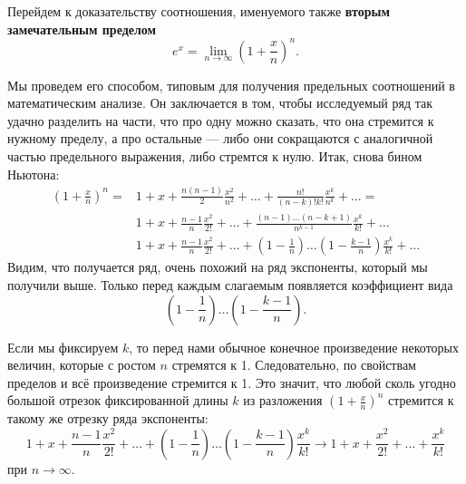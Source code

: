 \begin{enumerate}
Перейдем к доказательству соотношения, именуемого также \textbf{вторым замечательным пределом}
$$
e^x=\lim_{n\to\infty}\left(1+\frac xn\right)^n.
$$

Мы проведем его способом, типовым для получения предельных соотношений в математическим анализе. Он заключается в том, чтобы исследуемый ряд так удачно разделить на части, что про одну можно сказать, что она стремится к нужному пределу, а про остальные --- либо они сокращаются с аналогичной частью предельного выражения, либо стремтся к нулю. Итак, снова бином Ньютона:
\begin{align*}
\left(1+\frac xn\right)^n = & 1 + x + \frac{n(n-1)}{2}\frac{x^2}{n^2} + \dots +
\frac{n!}{(n-k)!k!}\frac{x^k}{n^k}+\dots = \\
& 1 + x + \frac{n-1}{n}\frac{x^2}{2!} + \dots + \frac{(n-1)\dots(n-k+1)}{n^{k-1}}\frac{x^k}{k!}+\dots \\
& 1 + x + \frac{n-1}{n}\frac{x^2}{2!} + \dots + \left(1-\frac 1n\right)\dots\left(1-\frac{k-1}{n}\right)\frac{x^k}{k!}+\dots
\end{align*}
Видим, что получается ряд, очень похожий на ряд экспоненты, который мы получили выше. Только перед каждым слагаемым появляется коэффициент вида
$$
\left(1-\frac 1n\right)\dots\left(1-\frac{k-1}{n}\right).
$$

Если мы фиксируем $k$, то перед нами обычное конечное произведение некоторых величин, которые с ростом $n$ стремятся к 1. Следовательно, по свойствам пределов и всё произведение стремится к 1. Это значит, что любой сколь угодно большой отрезок фиксированной длины $k$ из разложения $\left(1+\frac xn\right)^n$ стремится к такому же отрезку ряда экспоненты:
$$
1 + x + \frac{n-1}{n}\frac{x^2}{2!} + \dots + \left(1-\frac 1n\right)\dots\left(1-\frac{k-1}{n}\right)\frac{x^k}{k!} \to
1 + x + \frac{x^2}{2!} + \dots + \frac{x^k}{k!}
$$
при $n\to\infty$.


\end{enumerate}
